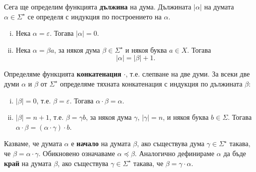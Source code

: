 Сега ще определим функцията {\bf дължина} на дума.
Дължината $|\alpha|$ на думата $\alpha \in \Sigma^\star$ се определя с индукция по построението на $\alpha$.
\begin{enumerate}[(i)]
  \item
    Нека $\alpha = \varepsilon$. Тогава $|\alpha| = 0$.
  \item
    Нека $\alpha = \beta a$, за някоя дума $\beta\in \Sigma^\star$ и някоя буква $a\in X$.
    Тогава \[|\alpha| = |\beta| + 1.\]
\end{enumerate}

Определяме функцията {\bf конкатенация} $\cdot$, т.е.
слепване на две думи.
За всеки две думи $\alpha$ и $\beta$ от $\Sigma^\star$ определяме тяхната конкатенация с индукция по дължината $\beta$:
\begin{enumerate}[(i)]
  \item
    $|\beta| = 0$, т.е. $\beta = \varepsilon$.
    Тогава $\alpha\cdot\beta = \alpha$.
  \item
    $|\beta| = n+1$, т.е. $\beta = \gamma b$, за някоя дума $\gamma$, $|\gamma| = n$, и някоя буква $b\in\Sigma$.
    Тогава $\alpha\cdot\beta = (\alpha\cdot\gamma)\cdot b$.
\end{enumerate}

Казваме, че думата $\alpha$ е {\bf начало} на думата $\beta$, ако съществува дума $\gamma \in \Sigma^\star$ такава, че
$\beta = \alpha\cdot\gamma$. Обикновено означаваме $\alpha \preceq \beta$.
Аналогично дефинираме $\alpha$ да бъде {\bf край} на думата $\beta$, ако съществува $\gamma \in \Sigma^\star$ такава, че
$\beta = \gamma \cdot \alpha$.

